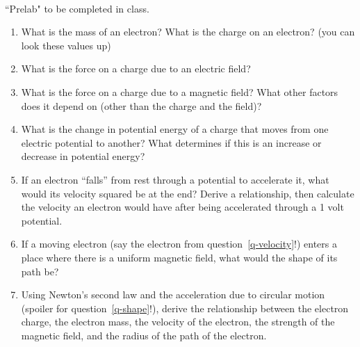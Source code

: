 \documentclass{tufte-handout}
\begin{document}



\vspace{0.5cm}
\\
\vspace{0.5cm}

``Prelab" to be completed in class.

\begin{enumerate}

\item What is the mass of an electron? What is the charge on an electron? (you can look these values up)

\item What is the force on a charge due to an electric field?

\item What is the force on a charge due to a magnetic field?  What other factors does it depend on (other than the charge and the field)?

\item What is the change in potential energy of a charge that moves from one electric potential to another?  What determines if this is an increase or decrease in potential energy?

\item \label{q-velocity} If an electron ``falls'' from rest through a potential to accelerate it, what would its velocity squared be at the end? Derive a relationship, then calculate the velocity an electron would have after
being accelerated through a 1 volt potential. 

\item \label{q-shape} If a moving electron (say the electron from question~\ref{q-velocity}!) enters a place where there is a uniform magnetic field, what would the shape of its path be?

\item \label{q-newton} Using Newton's second law and the acceleration due to circular motion (spoiler for question~\ref{q-shape}!), derive the relationship between the electron charge, the electron mass, the velocity of the electron, the strength of the magnetic field, and the radius of the path of the electron.  



\end{enumerate}
\end{document}
